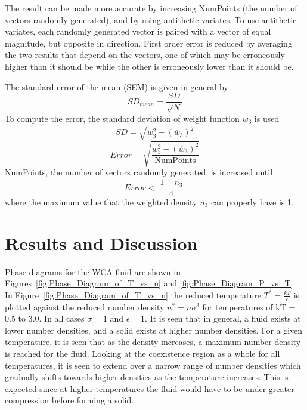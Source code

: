 \documentclass[double,12pt]{beavtex}
\begin{document}
The result can be made more accurate by increasing NumPoints (the 
number of vectors randomly generated), and by using antithetic variates.
To use antithetic variates, each randomly generated  vector is paired 
with a vector of equal magnitude, but opposite in direction. 
First order error is reduced by averaging the two results that depend on 
the vectors, one of which may be erroneously higher than it should be 
while the other is erroneously lower than it should be.

The standard error of the mean (SEM) is given in general by
\begin{equation}{SD_{mean}=\frac{SD}{\sqrt{N}}}\end{equation} 
To compute the error, the standard deviation of weight function $w_3$ is used 
\begin{equation}SD=\sqrt{\overline{w_3^2}-(\overline{w}_3)^2}\end{equation} 
\begin{equation}{Error=\sqrt{\frac{\overline{w_3^2}-(\overline{w}_3)^2}{\text{NumPoints}}}}\end{equation} 
NumPoints, the number of vectors randomly generated, is increased until
\begin{equation}{Error<\frac{|1-n_3|}{4}}\end{equation}
where the maximum value that the weighted density $n_3$ 
can properly have is 1.

\chapter{Results and Discussion}

Phase diagrams for the WCA fluid are shown in Figures~\ref{fig:Phase_Diagram_of_T_vs_n} 
and \ref{fig:Phase_Diagram_P_vs_T}. 
In Figure~\ref{fig:Phase_Diagram_of_T_vs_n} the reduced temperature 
$T^*=\frac{kT}{\epsilon}$ is plotted against the reduced number density 
$n^*=n\sigma^3$ for temperatures of kT = 0.5 to 3.0. 
In all cases $\sigma=1$ and $\epsilon=1$. 
It is seen that in general, a fluid exists at lower number densities, 
and a solid exists at higher number densities. 
For a given temperature, it is seen that as the density increases, 
a maximum number density is reached for the fluid. 
Looking at the coexistence region as a whole for all temperatures, 
it is seen to extend over a narrow range of number densities which 
gradually shifts towards higher densities as the temperature increases. 
This is expected since at higher temperatures the fluid would have to 
be under greater compression before forming a solid. 
\end{document}
